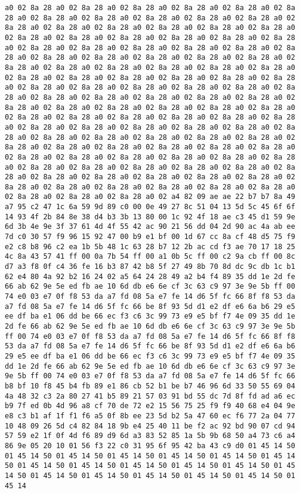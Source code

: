 \documentclass{article}
\begin{document}
\begin{verbatim}
a0 02 8a 28 a0 02 8a 28 a0 02 8a 28 a0 02 8a 28 a0 02 8a 28 a0 02 8a 28 a0 02 8a 28 a0 02 8a 28 a0 02 8a 28 a0 02 8a 28 a0 02 8a 28 a0 02 8a 28 a0 02 8a 28 a0 02 8a 28 a0 02 8a 28 a0 02 8a 28 a0 02 8a 28 a0 02 8a 28 a0 02 8a 28 a0 02 8a 28 a0 02 8a 28 a0 02 8a 28 a0 02 8a 28 a0 02 8a 28 a0 02 8a 28 a0 02 8a 28 a0 02 8a 28 a0 02 8a 28 a0 02 8a 28 a0 02 8a 28 a0 02 8a 28 a0 02 8a 28 a0 02 8a 28 a0 02 8a 28 a0 02 8a 28 a0 02 8a 28 a0 02 8a 28 a0 02 8a 28 a0 02 8a 28 a0 02 8a 28 a0 02 8a 28 a0 02 8a 28 a0 02 8a 28 a0 02 8a 28 a0 02 8a 28 a0 02 8a 28 a0 02 8a 28 a0 02 8a 28 a0 02 8a 28 a0 02 8a 28 a0 02 8a 28 a0 02 8a 28 a0 02 8a 28 a0 02 8a 28 a0 02 8a 28 a0 02 8a 28 a0 02 8a 28 a0 02 8a 28 a0 02 8a 28 a0 02 8a 28 a0 02 8a 28 a0 02 8a 28 a0 02 8a 28 a0 02 8a 28 a0 02 8a 28 a0 02 8a 28 a0 02 8a 28 a0 02 8a 28 a0 02 8a 28 a0 02 8a 28 a0 02 8a 28 a0 02 8a 28 a0 02 8a 28 a0 02 8a 28 a0 02 8a 28 a0 02 8a 28 a0 02 8a 28 a0 02 8a 28 a0 02 8a 28 a0 02 8a 28 a0 02 8a 28 a0 02 8a 28 a0 02 8a 28 a0 02 8a 28 a0 02 8a 28 a0 02 8a 28 a0 02 8a 28 a0 02 8a 28 a0 02 8a 28 a0 02 8a 28 a0 02 8a 28 a0 02 8a 28 a0 02 8a 28 a0 02 8a 28 a0 02 8a 28 a0 02 8a 28 a0 02 8a 28 a0 02 8a 28 a0 02 8a 28 a0 02 8a 28 a0 02 8a 28 a0 02 8a 28 a0 02 8a 28 a0 02 8a 28 a0 02 8a 28 a0 02 8a 28 a0 02 8a 28 a0 02 8a 28 a0 02 8a 28 a0 02 8a 28 a0 02 8a 28 a0 02 8a 28 a0 02 a4 82 09 ae ae 22 b7 b7 8a 49 a7 95 c2 47 1c 6a 59 9d 89 c0 00 0e 49 27 8c 51 04 13 5d 5c 45 6f 6f 14 93 4f 2b 84 8e 38 d4 b3 3b 13 80 00 1c 92 4f 18 ae c3 45 d1 59 9e 6d 3b 4e 9e 3f 37 61 4d 4f 55 42 ac 90 21 56 dd 04 2d 90 ac 4a ab ee 7d c0 30 57 f9 96 15 92 47 00 b9 e1 bf 00 1d 67 cc 8a cf 48 d5 75 f9 e2 c8 b8 96 c2 ea 1b 5b 48 1c 63 28 b7 12 2b ac cd f3 ae 70 17 18 25 4c 8a 43 57 41 ff 00 0a 7b 54 ff 00 a1 0b 5c ff 00 c2 9a cb ff 00 8c d7 a3 f8 0f c4 36 fe 16 b3 87 42 b8 5f 27 49 8b 70 8d dc 9c db 1c b1 62 e4 80 4a 92 b2 16 24 02 a5 64 24 28 49 a2 b4 f4 89 35 dd 1e 2d fe 66 ab 62 9e 5e ed fb ae 10 6d db e6 6e cf 3c 63 c9 97 3e 9e 5b ff 00 74 e0 03 e7 0f f8 53 da a7 fd 08 5a e7 fe 14 d6 5f fc 66 8f f8 53 da a7 fd 08 5a e7 fe 14 d6 5f fc 66 be 8f 93 5d d1 e2 df e6 6a b6 29 e5 ee df ba e1 06 dd be 66 ec f3 c6 3c 99 73 e9 e5 bf f7 4e 09 35 dd 1e 2d fe 66 ab 62 9e 5e ed fb ae 10 6d db e6 6e cf 3c 63 c9 97 3e 9e 5b ff 00 74 e0 03 e7 0f f8 53 da a7 fd 08 5a e7 fe 14 d6 5f fc 66 8f f8 53 da a7 fd 08 5a e7 fe 14 d6 5f fc 66 be 8f 93 5d d1 e2 df e6 6a b6 29 e5 ee df ba e1 06 dd be 66 ec f3 c6 3c 99 73 e9 e5 bf f7 4e 09 35 dd 1e 2d fe 66 ab 62 9e 5e ed fb ae 10 6d db e6 6e cf 3c 63 c9 97 3e 9e 5b ff 00 74 e0 03 e7 0f f8 53 da a7 fd 08 5a e7 fe 14 d6 5f fc 66 b8 bf 10 f8 45 b4 fb 89 e1 86 cb 52 b1 be b7 46 96 6d 33 50 55 69 04 4a 48 32 c3 2a 80 27 41 b5 89 21 57 03 91 bd 55 dc 7d 8f fd ad a6 ec b9 7f ed 0b 4d 96 a8 cf 70 de 72 e2 15 56 75 25 f9 f9 40 68 e4 04 9e e8 c3 b1 af 1f f1 f6 a5 0f 8b ee 23 5d b2 5a 47 60 ec f6 77 2a 04 77 10 48 09 26 5d c4 82 84 18 9b e4 25 40 11 be f2 ac 92 bd 90 07 cd 94 57 59 e2 1f 0f 4d f6 89 d9 6d a3 83 52 85 1a 5b 9b 68 50 a4 73 c6 a4 86 9e 05 20 10 01 56 f3 22 c0 31 95 6f 95 42 ba 43 c9 d0 01 45 14 50 01 45 14 50 01 45 14 50 01 45 14 50 01 45 14 50 01 45 14 50 01 45 14 50 01 45 14 50 01 45 14 50 01 45 14 50 01 45 14 50 01 45 14 50 01 45 14 50 01 45 14 50 01 45 14 50 01 45 14 50 01 45 14 50 01 45 14 50 01 45 14 
\end{verbatim}
\end{document}
